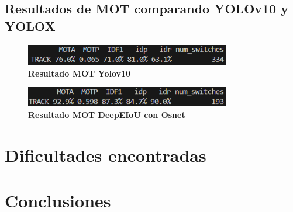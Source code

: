\documentclass[12pt, a4paper, twoside]{article}
\begin{document}
 	\subsection{Resultados de MOT comparando YOLOv10 y YOLOX}
	
	\begin{figure}[H]
		\centering
		\includegraphics[width=0.8\textwidth]{image/metricas_mot_yolo10}
		\caption{\textbf{Resultado MOT Yolov10}}
		\label{fig:Resultado Yolov10 mot}
	\end{figure}
	
	\begin{figure}[H]
		\centering
		\includegraphics[width=0.8\textwidth]{image/metricas_mot_deepEIoU}
		\caption{\textbf{Resultado MOT DeepEIoU con Osnet}}
		\label{fig:Resultado DeepEIoU con Osnet mot}
	\end{figure}
	
	\section{Dificultades encontradas}
	
	
	
	\section{Conclusiones}
	
	
	
	\printbibliography
	
	
	
	
\end{document}
